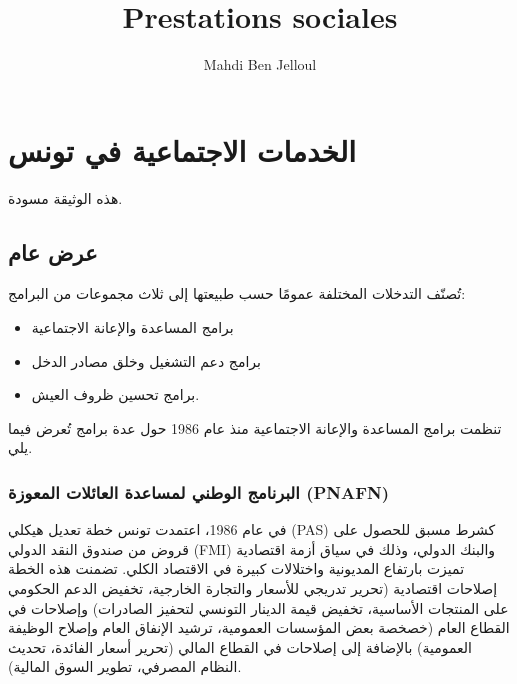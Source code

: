 \documentclass[
  letterpaper,
  DIV=11,
  numbers=noendperiod]{scrreprt}
\title{Prestations sociales}
\author{Mahdi Ben Jelloul}
\date{}
\providecommand{\tightlist}{%
  \setlength{\itemsep}{0pt}\setlength{\parskip}{0pt}}\usepackage{longtable,booktabs,array}
\renewcommand*\contentsname{Table of contents}
\newcommand\contentsname{Table of contents}
\begin{document}
\maketitle

\renewcommand*\contentsname{Table of contents}
{
\hypersetup{linkcolor=}
\setcounter{tocdepth}{2}
\tableofcontents
}


\chapter{الخدمات الاجتماعية في
تونس}\label{ux627ux644ux62eux62fux645ux627ux62a-ux627ux644ux627ux62cux62aux645ux627ux639ux64aux629-ux641ux64a-ux62aux648ux646ux633}

هذه الوثيقة مسودة.

\section{عرض عام}\label{ux639ux631ux636-ux639ux627ux645}

تُصنّف التدخلات المختلفة عمومًا حسب طبيعتها إلى ثلاث مجموعات من البرامج:

\begin{itemize}
\tightlist
\item
  برامج المساعدة والإعانة الاجتماعية
\item
  برامج دعم التشغيل وخلق مصادر الدخل
\item
  برامج تحسين ظروف العيش.
\end{itemize}

تنظمت برامج المساعدة والإعانة الاجتماعية منذ عام 1986 حول عدة برامج تُعرض
فيما يلي.

\subsection{البرنامج الوطني لمساعدة العائلات المعوزة
(PNAFN)}\label{ux627ux644ux628ux631ux646ux627ux645ux62c-ux627ux644ux648ux637ux646ux64a-ux644ux645ux633ux627ux639ux62fux629-ux627ux644ux639ux627ux626ux644ux627ux62a-ux627ux644ux645ux639ux648ux632ux629-pnafn}

في عام 1986، اعتمدت تونس خطة تعديل هيكلي (PAS) كشرط مسبق للحصول على قروض
من صندوق النقد الدولي (FMI) والبنك الدولي، وذلك في سياق أزمة اقتصادية
تميزت بارتفاع المديونية واختلالات كبيرة في الاقتصاد الكلي. تضمنت هذه
الخطة إصلاحات اقتصادية (تحرير تدريجي للأسعار والتجارة الخارجية، تخفيض
الدعم الحكومي على المنتجات الأساسية، تخفيض قيمة الدينار التونسي لتحفيز
الصادرات) وإصلاحات في القطاع العام (خصخصة بعض المؤسسات العمومية، ترشيد
الإنفاق العام وإصلاح الوظيفة العمومية) بالإضافة إلى إصلاحات في القطاع
المالي (تحرير أسعار الفائدة، تحديث النظام المصرفي، تطوير السوق المالية).
\end{document}
